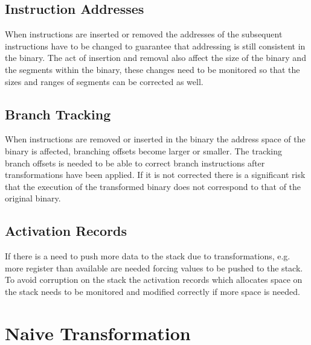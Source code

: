 \subsection{Instruction Addresses}
When instructions are inserted or removed the addresses of the
subsequent instructions have to be changed to guarantee that
addressing is still consistent in the binary. The act of insertion
and removal also affect the size of the binary and the segments
within the binary, these changes need to be monitored so that
the sizes and ranges of segments can be corrected as well.


\subsection{Branch Tracking}
When instructions are removed or inserted in the binary the address
space of the binary is affected, branching offsets become larger
or smaller. The tracking branch offsets is needed to be able to correct
branch instructions after transformations have been applied.
If it is not corrected there is a significant risk that
the execution of the transformed binary does not correspond to that of the
original binary.

\subsection{Activation Records}
If there is a need to push more data to the stack due to transformations, e.g. 
more register than available are needed forcing values to be pushed to the stack. 
To avoid corruption on the stack the activation records which allocates space
on the stack needs to be monitored and modified correctly if more space is needed.


\section{Naive Transformation}



